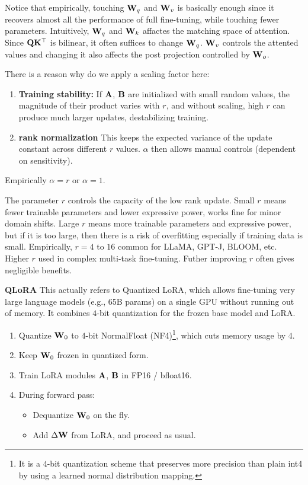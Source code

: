 \documentclass[11pt]{article}  %
\begin{document}
Notice that empirically, touching $\mathbf{W}_q$ and $\mathbf{W}_v$ is basically enough since it recovers almost all the performance of full fine-tuning, while touching fewer parameters.
Intuitively, $\mathbf{W}_q$ and $\mathbf{W}_k$ affactes the matching space of attention.
Since $\mathbf{Q}\mathbf{K}^{\top}$ is bilinear, it often suffices to change $\mathbf{W}_q$.  
$\mathbf{W}_v$ controls the attented values and changing it also affects the post projection controlled by $\mathbf{W}_o$.

There is a reason why do we apply a scaling factor here:
\begin{enumerate}
  \item \textbf{Training stability:} If $\mathbf{A}$, $\mathbf{B}$ are initialized with small random values, the magnitude of their product varies with $r$, and without scaling, high $r$ can produce much larger updates, destabilizing training. 
  \item \textbf{rank normalization} This keeps the expected variance of the update constant across different $r$ values. 
  $\alpha$ then allows manual controls (dependent on sensitivity).
\end{enumerate}
Empirically $\alpha = r$ or $\alpha = 1$.

The parameter $r$ controls the capacity of the low rank update.
Small $r$ means fewer trainable parameters and lower expressive power, works fine for minor domain shifts.
Large $r$ means more trainable parameters and expressive power, but if it is too large, then there is a risk of overfitting especially if training data is small. 
Empirically, $r = 4$ to $16$ common for LLaMA, GPT-J, BLOOM, etc.
Higher $r$ used in complex multi-task fine-tuning.
Futher improving $r$ often gives negligible benefits.


\textbullet \textbf{QLoRA}
This actually refers to Quantized LoRA, which allows fine-tuning very large language models (e.g., 65B params) on a single GPU without running out of memory.
It combines $4$-bit quantization for the frozen base model and LoRA.

\begin{enumerate}
  \item Quantize $\mathbf{W}_0$ to $4$-bit NormalFloat (NF4)\footnote{It is a $4$-bit quantization scheme that preserves more precision than plain int4 by using a learned normal distribution mapping.}, which cuts memory usage by $4$.
  \item Keep $\mathbf{W}_0$ frozen in quantized form.
  \item Train LoRA modules $\mathbf{A}$, $\mathbf{B}$ in FP16 / bfloat16.
  \item During forward pass: \begin{itemize}
    \item Dequantize $\mathbf{W}_0$ on the fly.
    \item Add $\Delta \mathbf{W}$ from LoRA, and proceed as usual.
  \end{itemize}
\end{enumerate}
\end{document}

